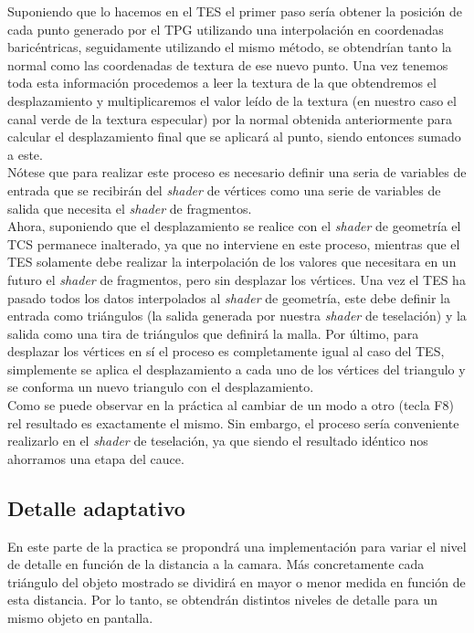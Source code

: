 \documentclass[10pt,oneside,a4paper]{article}
\begin{document}
Suponiendo que lo hacemos en el TES el primer paso sería obtener la posición de cada punto generado por el TPG utilizando una interpolación en coordenadas baricéntricas, seguidamente utilizando el mismo método, se obtendrían tanto la normal como las coordenadas de textura de ese nuevo punto.
Una vez tenemos toda esta información procedemos a leer la textura de la que obtendremos el desplazamiento y multiplicaremos el valor leído de la textura (en nuestro caso el canal verde de la textura especular) por la normal obtenida anteriormente para calcular el desplazamiento final que se aplicará al punto, siendo entonces sumado a este.\\

Nótese que para realizar este proceso es necesario definir una seria de variables de entrada que se recibirán del \textit{shader} de vértices como una serie de variables de salida que necesita el \textit{shader} de fragmentos. \\

Ahora, suponiendo que el desplazamiento se realice con el \textit{shader} de geometría el TCS permanece inalterado, ya que no interviene en este proceso, mientras que el TES solamente debe realizar la interpolación de los valores que necesitara en un futuro el \textit{shader} de fragmentos, pero sin desplazar los vértices. Una vez el TES ha pasado todos los datos interpolados al \textit{shader} de geometría, este debe definir la entrada como triángulos (la salida generada por nuestra \textit{shader} de teselación) y la salida como una tira de triángulos que definirá la malla.
Por último, para desplazar los vértices en sí el proceso es completamente igual al caso del TES, simplemente se aplica el desplazamiento a cada uno de los vértices del triangulo y se conforma un nuevo triangulo con el desplazamiento.\\

Como se puede observar en la práctica al cambiar de un modo a otro (tecla F8) rel resultado es exactamente el mismo. Sin embargo, el proceso sería conveniente realizarlo en el \textit{shader} de teselación, ya que siendo el resultado idéntico nos ahorramos una etapa del cauce. 
\subsection{Detalle adaptativo}
En este parte de la practica se propondrá una implementación para variar el nivel de detalle en función de la distancia a la camara. Más concretamente cada triángulo del objeto mostrado se dividirá en mayor o menor medida en función de esta distancia. Por lo tanto, se obtendrán distintos niveles de detalle para un mismo objeto en pantalla.\\
\end{document}

